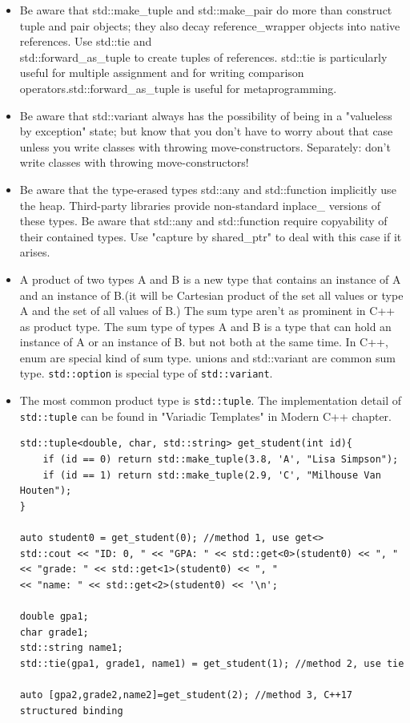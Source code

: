 \documentclass[a4paper,11pt,twoside]{book}
\begin{document}
\begin{itemize}
	\item Be aware that std::make\_tuple and std::make\_pair do more than construct tuple and pair objects; they also decay reference\_wrapper objects into native references. Use std::tie and \\ std::forward\_as\_tuple to create tuples of references. std::tie is particularly useful for multiple assignment and for writing comparison operators.std::forward\_as\_tuple is useful for metaprogramming.
	
	\item Be aware that std::variant always has the possibility of being in a "valueless by exception" state; but know that you don't have to worry about that case unless you write classes with throwing move-constructors. Separately: don't write classes with throwing move-constructors! 
	
	\item Be aware that the type-erased types std::any and std::function implicitly use the heap. Third-party libraries provide non-standard inplace\_ versions of these types. Be aware that std::any and std::function require copyability of their contained types. Use "capture by shared\_ptr" to deal with this case if it arises.
	
	\item  A product of two types A and B is a new type that contains an instance of A and an instance of B.(it will be Cartesian product of the set all values or type A and the set of all values of B.) The sum type aren't as prominent in C++ as product type. The sum type of types A and B is a type that can hold an instance of A or an instance of B. but not both at the same time. In C++, enum are special kind of sum type. unions and std::variant are common sum type. \texttt{std::option} is special type of \texttt{std::variant}.  
	
	\item The most common product type is \texttt{std::tuple}. The implementation detail of \texttt{std::tuple} can be found in "Variadic Templates" in Modern C++ chapter. 
	
\begin{lstlisting}
std::tuple<double, char, std::string> get_student(int id){
	if (id == 0) return std::make_tuple(3.8, 'A', "Lisa Simpson");
	if (id == 1) return std::make_tuple(2.9, 'C', "Milhouse Van Houten");
}

auto student0 = get_student(0); //method 1, use get<>
std::cout << "ID: 0, " << "GPA: " << std::get<0>(student0) << ", "
<< "grade: " << std::get<1>(student0) << ", "
<< "name: " << std::get<2>(student0) << '\n';

double gpa1;
char grade1;
std::string name1;
std::tie(gpa1, grade1, name1) = get_student(1); //method 2, use tie

auto [gpa2,grade2,name2]=get_student(2); //method 3, C++17 structured binding
\end{lstlisting}

\end{itemize}
\end{document}
